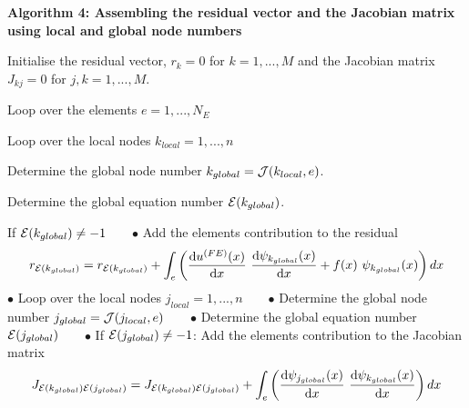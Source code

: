 \begin{center} {\bfseries  Algorithm 4\+: Assembling the residual vector and the Jacobian matrix using local and global node numbers } \end{center} 
\begin{DoxyItemize}
\item Initialise the residual vector, $ r_k=0 $ for $k=1,...,M $ and the Jacobian matrix $ J_{kj}=0 $ for $j,k=1,...,M. $
\item Loop over the elements $e = 1,...,N_E $
\begin{DoxyItemize}
\item Loop over the local nodes $ k_{local}=1,...,n $
\begin{DoxyItemize}
\item Determine the global node number $ k_{global}={\cal J}(k_{local},e) $.
\item Determine the global equation number ${\cal E}(k_{global})$.
\begin{DoxyItemize}
\item If ${\cal E}(k_{global})\ne -1$ ~\newline
~\newline
 $ \bullet $ Add the element\textquotesingle{}s contribution to the residual \[ r_{{\cal E}(k_{global})} = r_{{\cal E}(k_{global})} + \int_{e} \left( \frac{\mbox{d} u^{(FE)}(x)}{\mbox{d} x} \ \frac{\mbox{d} \psi_{k_{global}}(x)}{\mbox{d} x} + f(x) \ \psi_{k_{global}}(x) \right) dx \] $ \bullet $ Loop over the local nodes $ j_{local}=1,...,n $ ~\newline
~\newline
 $ \bullet $ Determine the global node number $ j_{global}={\cal J}(j_{local},e) $ ~\newline
~\newline
 $ \bullet $ Determine the global equation number ${\cal E}(j_{global})$ ~\newline
~\newline
 $ \bullet $ If ${\cal E}(j_{global})\ne -1$\+: Add the element\textquotesingle{}s contribution to the Jacobian matrix \[ J_{{\cal E}(k_{global}) {\cal E}(j_{global})} = J_{{\cal E}(k_{global}) {\cal E}(j_{global})} + \int_{e} \left( \frac{\mbox{d} \psi_{j_{global}}(x)}{\mbox{d} x} \ \frac{\mbox{d} \psi_{k_{global}}(x)}{\mbox{d} x} \right) dx \]
\end{DoxyItemize}
\end{DoxyItemize}
\end{DoxyItemize}
\end{DoxyItemize}



